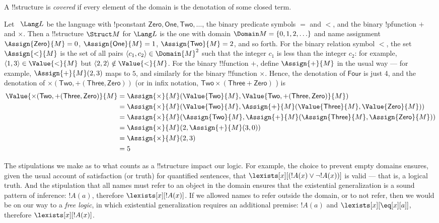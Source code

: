 \documentclass[../../include/open-logic-section]{subfiles}
\begin{document}
\begin{defn}
A !!{structure} is \emph{covered} if every element of the domain is the
denotation of some closed term.
\end{defn}

\begin{ex}
Let ~$\Lang L$ be the language with !p{constant} $\mathsf{Zero},
\mathsf{One}, \mathsf{Two}, \ldots$, the binary predicate symbols $=$
and $<$, and the binary !p{function} $+$ and $\times$.  Then a
!!{structure} $\Struct M$ for $\Lang L$ is the one with domain
$\Domain M = \{0, 1, 2, \ldots \}$ and name assignment
$\Assign{\mathsf{Zero}}{M} = 0$, $\Assign{\mathsf{One}}{M} = 1$,
$\Assign{\mathsf{Two}}{M} = 2$, and so forth. For the binary relation
symbol $<$, the set $\Assign{<}{M}$ is the set of all pairs $\langle
c_1, c_2 \rangle \in \Domain{M}^2$ such that the integer $c_1$ is less
than the integer $c_2$: for example, $\langle 1, 3 \rangle \in
\Value{<}{M}$ but $\langle 2, 2 \rangle \notin \Value{<}{M}$. For the
binary !!{function} $+$, define $\Assign{+}{M}$ in the usual way ---
for example, $\Assign{+}{M}(2,3)$ maps to $5$, and similarly for the
binary !!{function} $\times$. Hence, the denotation of $\mathsf{Four}$
is just 4, and the denotation of $\times(\mathsf{Two},
+(\mathsf{Three},\mathsf{Zero}))$ (or in infix notation, $\mathsf{Two}
\times (\mathsf{Three} + \mathsf{Zero})$ ) is
\begin{align*} 
\Value{\times(\mathsf{Two}, +(\mathsf{Three},\mathsf{Zero})}{M}&=
\Assign{\times}{M}(\Value{\mathsf{Two}}{M}, \Value{\mathsf{Two}, 
+(\mathsf{Three}, \mathsf{Zero})}{M})\\
&= \Assign{\times}{M}(\Value{\mathsf{Two}}{M}, \Assign{+}{M}(\Value{\mathsf{Three}}{M}, 
\Value{\mathsf{Zero}}{M})) \\
&= \Assign{\times}{M}(\Assign{\mathsf{Two}}{M}, \Assign{+}{M}(\Assign{\mathsf{Three}}{M}, 
\Assign{\mathsf{Zero}}{M})) \\
&= \Assign{\times}{M}(2, \Assign{+}{M}(3, 0)) \\
&= \Assign{\times}{M}(2, 3) \\
&= 5
\end{align*}
\end{ex}

\begin{digress}
The stipulations we make as to what counts as a !!{structure} impact
our logic. For example, the choice to prevent empty domains ensures,
given the usual account of satisfaction (or truth) for quantified
sentences, that $\lexists[x][(!A(x) \lor \lnot !A(x))]$ is valid ---
that is, a logical truth. And the stipulation that all names must
refer to an object in the domain ensures that the existential
generalization is a sound pattern of inference: $!A(a)$, therefore
$\lexists[x][!A(x)]$. If we allowed names to refer outside the domain,
or to not refer, then we would be on our way to a \emph{free logic},
in which existential generalization requires an additional premise:
$!A(a)$ and $\lexists[x][\eq[x][a]]$, therefore $\lexists[x][!A(x)]$.
\end{digress}
\end{document}
